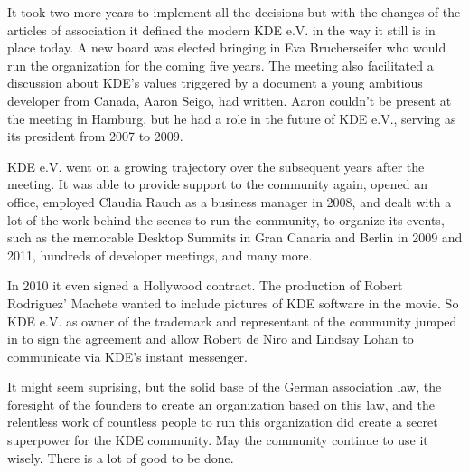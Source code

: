 It took two more years to implement all the decisions but with the changes of the articles of association it defined the modern KDE e.V. in the way it still is in place today. A new board was elected bringing in Eva Brucherseifer who would run the organization for the coming five years. The meeting also facilitated a discussion about KDE's values triggered by a document a young ambitious developer from Canada, Aaron Seigo, had written. Aaron couldn't be present at the meeting in Hamburg, but he had a role in the future of KDE e.V., serving as its president from 2007 to 2009.

KDE e.V. went on a growing trajectory over the subsequent years after the meeting. It was able to provide support to the community again, opened an office, employed Claudia Rauch as a business manager in 2008, and dealt with a lot of the work behind the scenes to run the community, to organize its events, such as the memorable Desktop Summits in Gran Canaria and Berlin in 2009 and 2011, hundreds of developer meetings, and many more.

In 2010 it even signed a Hollywood contract. The production of Robert Rodriguez' Machete wanted to include pictures of KDE software in the movie. So KDE e.V. as owner of the trademark and representant of the community jumped in to sign the agreement and allow Robert de Niro and Lindsay Lohan to communicate via KDE's instant messenger.

It might seem suprising, but the solid base of the German association law, the foresight of the founders to create an organization based on this law, and the relentless work of countless people to run this organization did create a secret superpower for the KDE community. May the community continue to use it wisely. There is a lot of good to be done.

